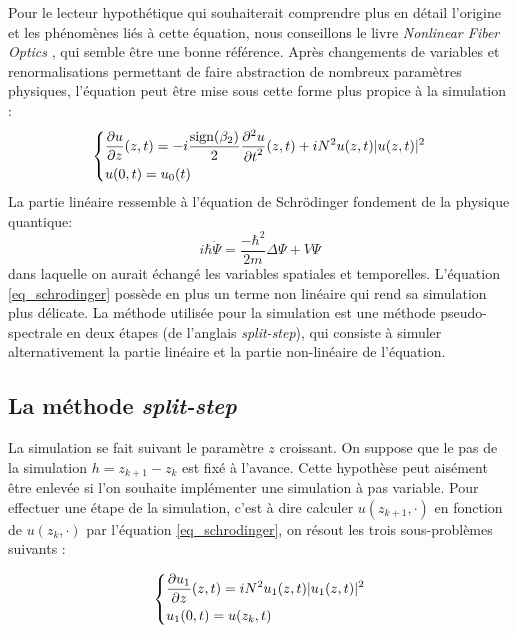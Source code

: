 \documentclass{article}
\begin{document}
 Pour le lecteur hypothétique qui souhaiterait comprendre plus en détail l'origine et les phénomènes liés à cette équation, nous conseillons le livre \emph{Nonlinear Fiber Optics} \cite{NFO}, qui semble être une bonne référence. Après changements de variables et renormalisations permettant de faire abstraction de nombreux paramètres physiques, l'équation peut être mise sous cette forme plus propice à la simulation :
\begin{equation}
  \begin{dcases*}
    \frac{\partial u}{\partial z}(z, t) = - i\frac{\text{sign}(\beta_2)}{2} \frac{\partial^2 u}{{\partial t}^2}(z, t) + iN^2u(z, t)|u(z, t)|^2 \\
    u(0, t) = u_0(t)
  \end{dcases*}
  \label{eq_schrodinger}
\end{equation}
La partie linéaire ressemble à l'équation de Schrödinger fondement de la physique quantique:
\begin{equation*}
  i\hbar \dot{\Psi} = \frac{-\hbar^2}{2m}\Delta\Psi + V\Psi
\end{equation*}
dans laquelle on aurait échangé les variables spatiales et temporelles. L'équation \eqref{eq_schrodinger} possède en plus un terme non linéaire qui rend sa simulation plus délicate. La méthode utilisée pour la simulation est une méthode pseudo-spectrale en deux étapes (de l'anglais \emph{split-step}), qui consiste à simuler alternativement la partie linéaire et la partie non-linéaire de l'équation.

\subsection{La méthode \emph{split-step}}

La simulation se fait suivant le paramètre $z$ croissant. On suppose que le pas de la simulation $h = z_{k+1} - z_{k}$ est fixé à l'avance. Cette hypothèse peut aisément être enlevée si l'on souhaite implémenter une simulation à pas variable.
Pour effectuer une étape de la simulation, c'est à dire calculer $u(z_{k+1}, \cdot)$ en fonction de $u(z_{k}, \cdot)$ par l'équation \eqref{eq_schrodinger}, on résout les trois sous-problèmes suivants :

\begin{equation}
  \begin{dcases*}
    \frac{\partial u_1}{\partial z}(z, t) =   iN^2u_1(z, t)|u_1(z, t)|^2 \\
    u_1(0, t) = u(z_k, t) 
  \end{dcases*}
  \label{eq_nl1}
\end{equation}
\end{document}
